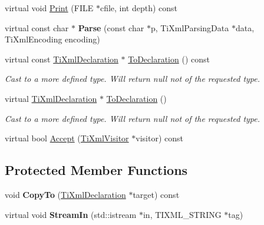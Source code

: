 \begin{DoxyCompactItemize}
\item 
virtual void \hyperlink{class_ti_xml_declaration_abf6303db4bd05b5be554036817ff1cb4}{Print} (FILE $\ast$cfile, int depth) const 
\item 
\hypertarget{class_ti_xml_declaration_a12dbb498d45f74fe58cd05dde608a39d}{
virtual const char $\ast$ {\bfseries Parse} (const char $\ast$p, TiXmlParsingData $\ast$data, TiXmlEncoding encoding)}
\label{class_ti_xml_declaration_a12dbb498d45f74fe58cd05dde608a39d}

\item 
\hypertarget{class_ti_xml_declaration_a1e085d3fefd1dbf5ccdbff729931a967}{
virtual const \hyperlink{class_ti_xml_declaration}{TiXmlDeclaration} $\ast$ \hyperlink{class_ti_xml_declaration_a1e085d3fefd1dbf5ccdbff729931a967}{ToDeclaration} () const }
\label{class_ti_xml_declaration_a1e085d3fefd1dbf5ccdbff729931a967}

\begin{DoxyCompactList}\small\item\em Cast to a more defined type. Will return null not of the requested type. \item\end{DoxyCompactList}\item 
\hypertarget{class_ti_xml_declaration_a6bd3d1daddcaeb9543c24bfd090969ce}{
virtual \hyperlink{class_ti_xml_declaration}{TiXmlDeclaration} $\ast$ \hyperlink{class_ti_xml_declaration_a6bd3d1daddcaeb9543c24bfd090969ce}{ToDeclaration} ()}
\label{class_ti_xml_declaration_a6bd3d1daddcaeb9543c24bfd090969ce}

\begin{DoxyCompactList}\small\item\em Cast to a more defined type. Will return null not of the requested type. \item\end{DoxyCompactList}\item 
virtual bool \hyperlink{class_ti_xml_declaration_a22315a535983b86535cdba3458669e3e}{Accept} (\hyperlink{class_ti_xml_visitor}{TiXmlVisitor} $\ast$visitor) const 
\end{DoxyCompactItemize}
\subsection*{Protected Member Functions}
\begin{DoxyCompactItemize}
\item 
\hypertarget{class_ti_xml_declaration_a9d08959f935421a593032bd3efb30c38}{
void {\bfseries CopyTo} (\hyperlink{class_ti_xml_declaration}{TiXmlDeclaration} $\ast$target) const }
\label{class_ti_xml_declaration_a9d08959f935421a593032bd3efb30c38}

\item 
\hypertarget{class_ti_xml_declaration_a72e455200e6b6e265e76bdec4417bb73}{
virtual void {\bfseries StreamIn} (std::istream $\ast$in, TIXML\_\-STRING $\ast$tag)}
\label{class_ti_xml_declaration_a72e455200e6b6e265e76bdec4417bb73}

\end{DoxyCompactItemize}


